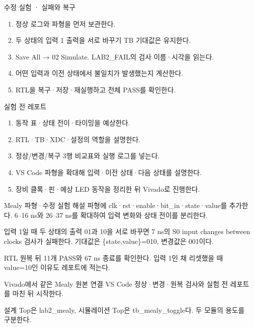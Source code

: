 \begin{frame}{수정 실험 · 실패와 복구}
\small
\begin{enumerate}
\item 정상 로그와 파형을 먼저 보관한다.
\item 두 상태의 입력 1 출력을 서로 바꾸기 TB 기대값은 유지한다.
\item Save All → 02 Simulate. LAB2\_FAIL의 검사 이름·시각을 읽는다.
\item 어떤 입력과 이전 상태에서 불일치가 발생했는지 계산한다.
\item RTL을 복구·저장·재실행하고 전체 PASS를 확인한다.
\end{enumerate}
\end{frame}

\begin{frame}[label=reports]{실험 전 레포트}
\small
\begin{enumerate}
\item 동작 표·상태 전이·타이밍을 예상한다.
\item RTL·TB·XDC·설정의 역할을 설명한다.
\item 정상/변경/복구 3행 비교표와 실행 로그를 넣는다.
\item VS Code 파형을 확대해 입력·이전 상태·다음 상태를 설명한다.
\item 장비 클록·핀·예상 LED 동작을 정리한 뒤 Vivado로 진행한다.
\end{enumerate}
\end{frame}

\begin{frame}{Mealy 파형·수정 실험 해설}
\small
파형에 clk·rst·enable·bit\_in·state·value를 추가한다. 6–16 ns와 26–37 ns를 확대하여 입력 변화와 상태 전이를 분리한다.\par\vspace{0.26cm}입력 1일 때 두 상태의 출력 01과 10을 서로 바꾸면 7 ns의 S0 input changes between clocks 검사가 실패한다. 기대값은 \{state,value\}=010, 변경값은 001이다.\par\vspace{0.26cm}RTL 원복 뒤 11개 PASS와 67 ns 종료를 확인한다. 입력 1인 채 리셋했을 때 value=10인 이유도 레포트에 적는다.\par
\end{frame}

\begin{frame}[label=implementation]{Vivado에서 같은 Mealy 원본 연결}
\small
VS Code 정상·변경·원복 검사와 실험 전 레포트를 마친 뒤 시작한다.\par\vspace{0.26cm}설계 Top은 lab2\_mealy, 시뮬레이션 Top은 tb\_mealy\_toggle다. 두 모듈의 용도를 구분한다.\par
\end{frame}

